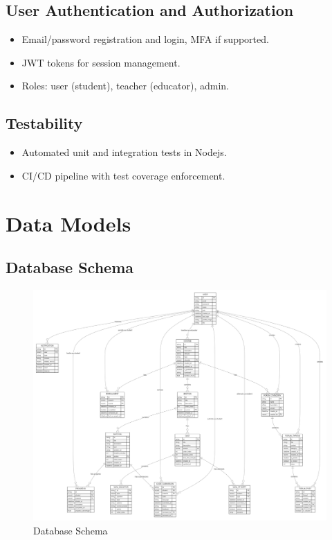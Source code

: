 \documentclass[a4paper, 11pt]{scrreprt}
\begin{document}
\section{User Authentication and Authorization}
\begin{itemize}
    \item Email/password registration and login, MFA if supported.
    \item JWT tokens for session management.
    \item Roles: user (student), teacher (educator), admin.
\end{itemize}

\section{Testability}
\begin{itemize}
    \item Automated unit and integration tests in Nodejs.
    \item CI/CD pipeline with test coverage enforcement.
\end{itemize}

\chapter{Data Models}

\section{Database Schema}
\begin{figure}[!ht]
    \centering
    \includegraphics[width=\textwidth]{database_schema.png}
    \caption{Database Schema}
\end{figure}
\end{document}
